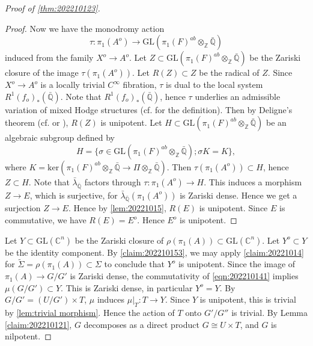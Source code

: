 \documentclass[11pt,english]{smfart}
\theoremstyle{plain}
\theoremstyle{definition}
\theoremstyle{remark}
\numberwithin{equation}{subsection}
\theoremstyle{plain}
\newcommand{\bQ}{\mathbb{Q}}
\begin{document}
\begin{proof}[Proof of \cref{thm:202210123}]
\begin{proof}
Now we have the monodromy action
\begin{equation*}
\tau:\pi_1(A^o)\to\mathrm{GL}(\pi_1(F)^{ab}\otimes_{\mathbb Z}\bar{\mathbb Q})
\end{equation*}
induced from the family $X^o\to A^o$.
Let $Z\subset \mathrm{GL}(\pi_1(F)^{ab}\otimes_{\mathbb Z}\bar{\mathbb Q})$ be the Zariski closure of the image $\tau(\pi_1(A^o))$.
Let $R(Z)\subset Z$ be the radical of $Z$. 
Since $X^o\to A^o$ is a locally trivial $C^\infty$ fibration, $\tau$ is dual to the local system $R^1(f_o)_*(\bar{\bQ})$. Note that $R^1(f_o)_*(\bar{\bQ})$, hence $\tau$ underlies an  admissible variation of mixed Hodge structures (cf. \cite{BZ14} for the definition). 
Then by Deligne's theorem (cf. \cite[Corollary 2]{And92} or \cite[4.2.9b]{Del71}), $R(Z)$ is unipotent. 
Let $H\subset \mathrm{GL}(\pi_1(F)^{ab}\otimes_{\mathbb Z}\bar{\mathbb Q})$ be an algebraic subgroup defined by
$$
H=\{\sigma \in \mathrm{GL}(\pi_1(F)^{ab}\otimes_{\mathbb Z}\bar{\mathbb Q}); \sigma K= K\},
$$
where $K=\mathrm{ker}(\pi_1(F)^{ab}\otimes_{\mathbb Z}\bar{\mathbb Q}\to \Pi\otimes_{\mathbb Z}\bar{\mathbb Q})$.
Then $\tau(\pi_1(A^o))\subset H$, hence $Z\subset H$.
Note that $\bar{\lambda}_{\bar{\mathbb Q}}$ factors through $\tau:\pi_1(A^o)\to H$. 
This induces a morphism $Z\to E$, which is
surjective, for $\bar{\lambda}_{\bar{\mathbb Q}}(\pi_1(A^o))$ is Zariski dense.
Hence we get a surjection $Z\to E$.
Hence by \cref{lem:20221015}, $R(E)$ is unipotent.
Since $E$ is commutative, we have $R(E)= E^o$.
Hence $E^o$ is unipotent.
\end{proof}

Let $Y\subset \mathrm{GL}(\mathbb C^n)$ be the Zariski closure of $
\rho(\pi_1(A))\subset \mathrm{GL}(\mathbb C^n)$.
Let $Y^o\subset Y$ be the identity component.
By \cref{claim:202210153}, we may apply \cref{claim:20221014} for 
$\widetilde{\Sigma}=\rho(\pi_1(A))\subset\Sigma$ to conclude that $Y^o$ is unipotent.
Since the image of $\pi_1(A)\to G/G'$ is Zariski dense, the commutativity of \eqref{eqn:202210141} implies $\mu(G/G')\subset Y$.
This is Zariski dense, in particular $Y^o=Y$.
By $G/G'= (U/G')\times T$, $\mu$ induces $\mu|_T:T\to Y$.
Since $Y$ is unipotent, this is trivial by \cref{lem:trivial morphism}. 
Hence the action of $T$ onto $G'/G''$ is trivial.
By Lemma \ref{claim:202210121}, $G$ decomposes as a direct product $G \cong U \times T$, and $G$ is nilpotent.
\end{proof}
\end{document}

